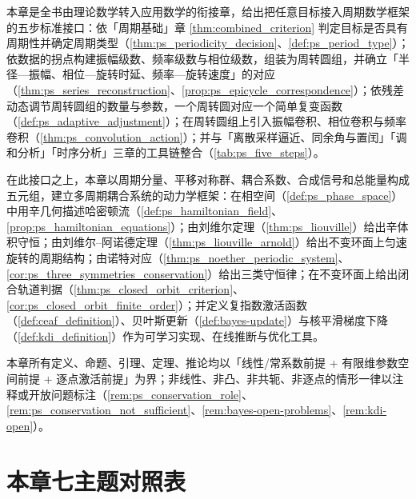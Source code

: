 \begin{remark}[本章小结]\label{rem:periodic-system-summary}
本章是全书由理论数学转入应用数学的衔接章，给出把任意目标接入周期数学框架的五步标准接口：依「周期基础」章 \cref{thm:combined_criterion} 判定目标是否具有周期性并确定周期类型（\cref{thm:ps_periodicity_decision}、\cref{def:ps_period_type}）；依数据的拐点构建振幅级数、频率级数与相位级数，组装为周转圆组，并确立「半径—振幅、相位—旋转时延、频率—旋转速度」的对应（\cref{thm:ps_series_reconstruction}、\cref{prop:ps_epicycle_correspondence}）；依残差动态调节周转圆组的数量与参数，一个周转圆对应一个简单复变函数（\cref{def:ps_adaptive_adjustment}）；在周转圆组上引入振幅卷积、相位卷积与频率卷积（\cref{thm:ps_convolution_action}）；并与「离散采样逼近、同余角与置闰」「调和分析」「时序分析」三章的工具链整合（\cref{tab:ps_five_steps}）。

在此接口之上，本章以周期分量、平移对称群、耦合系数、合成信号和总能量构成五元组，建立多周期耦合系统的动力学框架：在相空间（\cref{def:ps_phase_space}）中用辛几何描述哈密顿流（\cref{def:ps_hamiltonian_field}、\cref{prop:ps_hamiltonian_equations}）；由刘维尔定理（\cref{thm:ps_liouville}）给出辛体积守恒；由刘维尔--阿诺德定理（\cref{thm:ps_liouville_arnold}）给出不变环面上匀速旋转的周期结构；由诺特对应（\cref{thm:ps_noether_periodic_system}、\cref{cor:ps_three_symmetries_conservation}）给出三类守恒律；在不变环面上给出闭合轨道判据（\cref{thm:ps_closed_orbit_criterion}、\cref{cor:ps_closed_orbit_finite_order}）；并定义复指数激活函数（\cref{def:ceaf_definition}）、贝叶斯更新（\cref{def:bayes-update}）与核平滑梯度下降（\cref{def:kdi_definition}）作为可学习实现、在线推断与优化工具。

本章所有定义、命题、引理、定理、推论均以「线性/常系数前提 + 有限维参数空间前提 + 逐点激活前提」为界；非线性、非凸、非共轭、非逐点的情形一律以注释或开放问题标注（\cref{rem:ps_conservation_role}、\cref{rem:ps_conservation_not_sufficient}、\cref{rem:bayes-open-problems}、\cref{rem:kdi-open}）。
\end{remark}

\section*{本章七主题对照表}

